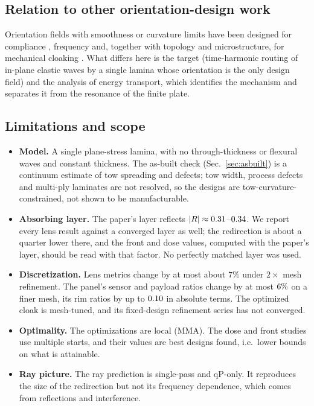\subsection{Relation to other orientation-design work}
Orientation fields with smoothness or curvature limits have been designed for compliance \cite{wong2025,jiang2024},
frequency \cite{abdalla2007,sheikhi2024,pagani2025} and, together with topology and microstructure, for
mechanical cloaking \cite{lutong2025}. What differs here is the target (time-harmonic routing of in-plane
elastic waves by a single lamina whose orientation is the only design field) and the analysis of energy
transport, which identifies the mechanism and separates it from the resonance of the finite plate.

\subsection{Limitations and scope}
\begin{itemize}[itemsep=2pt]
\item \textbf{Model.} A single plane-stress lamina, with no through-thickness or flexural waves and constant
  thickness. The as-built check (Sec.~\ref{sec:asbuilt}) is a continuum estimate of tow spreading and
  defects; tow width, process defects and multi-ply laminates are not resolved, so the designs are
  tow-curvature-constrained, not shown to be manufacturable.
\item \textbf{Absorbing layer.} The paper's layer reflects $|R|\approx0.31$--$0.34$. We report every lens
  result against a converged layer as well; the redirection is about a quarter lower there, and the front
  and dose values, computed with the paper's layer, should be read with that factor. No perfectly matched
  layer was used.
\item \textbf{Discretization.} Lens metrics change by at most about $7\%$ under $2\times$ mesh refinement. The
  panel's sensor and payload ratios change by at most $6\%$ on a finer mesh, its rim ratios by up to
  $0.10$ in absolute terms. The optimized cloak is mesh-tuned, and its fixed-design refinement series
  has not converged.
\item \textbf{Optimality.} The optimizations are local (MMA). The dose and front studies use multiple starts,
  and their values are best designs found, i.e.\ lower bounds on what is attainable.
\item \textbf{Ray picture.} The ray prediction is single-pass and qP-only. It reproduces the size of the
  redirection but not its frequency dependence, which comes from reflections and interference.
\end{itemize}

